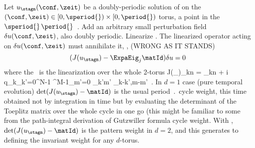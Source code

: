 Let
$u_\stagn(\conf,\zeit)$ be a doubly-periodic solution of  on the
$(\conf,\zeit)\in[0,\speriod{})\times[0,\period{})$ torus, a point in the
$\speriod{}\,\period{}$\dmn\ \statesp. Add an arbitrary small perturbation field
$\delta u(\conf,\zeit)$, also doubly periodic. Linearize .
The linearized operator acting on $\delta u(\conf,\zeit)$ must annihilate it, \ie,
(WRONG AS IT STANDS)
\[
(J(u_\stagn) -\ExpaEig_j \matId)\delta u =0
\]
where the \jacobianM\ is the linearization over the whole 2-torus
\beq
J(\Fu_\stagn)_{kn} =
\delta_{kn}
+ i q_k\!\sum_{k'=0}^{N-1} \sum^{M-1}_{m'=0}\!\!
\Fu_{k'm'} \delta_{k-k',m-m'}
\,.
\label{e-FksSpTmpJac}
\eeq
In $d=1$ case (pure temporal evolution) $\det(J(u_\stagn) -\matId)$ is the
usual period $\period{}$ cycle weight, this time obtained not by integration in
time but by evaluating the determinant of the Toeplitz matrix over the whole
cycle in one go (this might be familiar to some from the path-integral
derivation of Gutzwiller formula cycle weight. With ,
$\det(J(u_\stagn) -\matId)$ is the pattern weight in $d=2$, and this
generates to defining the invariant weight for any $d$-torus.
